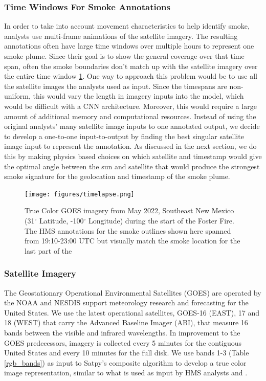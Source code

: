 \documentclass{ametsocV6.1}
\begin{document}
\subsubsection*{Time Windows For Smoke Annotations}

In order to take into account movement characteristics to help identify smoke, analysts use multi-frame animations of the satellite imagery. The resulting annotations often have large time windows over multiple hours to represent one smoke plume. Since their goal is to show the general coverage over that time span, often the smoke boundaries don't match up with the satellite imagery over the entire time window \ref{timelapse}. One way to approach this problem would be to use all the satellite images the
analysts used as input. Since the timespans are non-uniform, this would vary the length in imagery inputs into the model, which would be difficult with a CNN architecture. Moreover, this would require a large amount of additional memory and computational resources. Instead of using the original analysts' many satellite image inputs to one annotated output, we decide to develop a one-to-one input-to-output by finding the best singular satellite image input to represent the annotation. As
discussed in the next section, we do this by making physics based choices on which satellite and timestamp would give the optimal angle between the sun and satellite that would produce the strongest smoke signature for the geolocation and timestamp of the smoke plume. 

\begin{figure} \label{timelapse}
    \centering
    \texttt{[image: figures/timelapse.png]}
    \caption{True Color GOES imagery from May 2022, Southeast New Mexico (31$^{\circ}$ Latitude, -100$^{\circ}$ Longitude) during the start of the Foster Fire. The HMS annotations for the smoke outlines shown here spanned from 19:10-23:00 UTC but visually match the smoke location for the last part of the }
\end{figure}

\subsubsection*{Satellite Imagery} 

The Geostationary Operational Environmental Satellites (GOES) are operated by the NOAA and NESDIS support meteorology research and forecasting for the United States. We use the latest operational satellites, GOES-16 (EAST), 17 and 18 (WEST) that carry the Advanced Baseline Imager (ABI), that measure 16 bands between the visible and infrared wavelengths. In improvement to the GOES predecessors, imagery is collected every 5 minutes for the contiguous United States and every 10 minutes for the full disk. We use bands 1-3 (Table \ref{rgb_bands}) as input to Satpy's composite algorithm to develop a true color image representation, similar to what is used as input by HMS analysts \citep{satpy} and \citep{true_color}.
\end{document}
